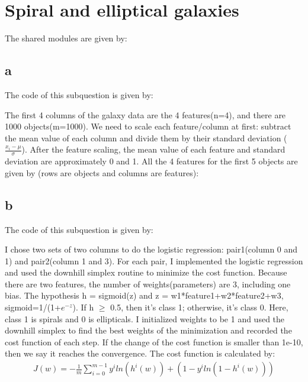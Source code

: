 \section{Spiral and elliptical galaxies}

The shared modules are given by:


\subsection{a}
The code of this subquestion is given by:


The first 4 columns of the galaxy data are the 4 features(n=4), and there are 1000 objects(m=1000). We need to scale each feature/column at first: subtract the mean value of each column and divide them by their standard deviation ($\frac{x_i-\mu}{\sigma}$). After the feature scaling, the mean value of each feature and standard deviation are approximately 0 and 1. All the 4 features for the first 5 objects are given by (rows are objects and columns are features):



\subsection{b}
The code of this subquestion is given by:


I chose two sets of two columns to do the logistic regression: pair1(column 0 and 1) and pair2(column 1 and 3). For each pair, I implemented the logistic regression and used the downhill simplex routine to minimize the cost function. Because there are two features, the number of weights(parameters) are 3, including one bias. The hypothesis h = sigmoid(z) and z = w1*feature1+w2*feature2+w3, sigmoid=1/(1+$e^{-z}$). If h $\geq$ 0.5, then it's class 1; otherwise, it's class 0. Here, class 1 is spirals and 0 is ellipticals. I initialized weights to be 1 and used the downhill simplex to find the best weights of the minimization and recorded the cost function of each step. If the change of the cost function is smaller than 1e-10, then we say it reaches the convergence. The cost function is calculated by:
\begin{equation}
  \label{eq:4}
  \begin{aligned}
   J(w)=-\frac{1}{m}\sum_{i=0}^{m-1} {y^iln(h^i(w))+(1-y^iln(1-h^i(w)))}
  \end{aligned}
\end{equation}

